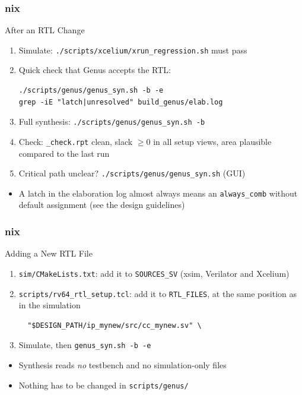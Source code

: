 \documentclass{beamer}
\newcommand{\astitle}{nix}
\newcommand{\assubtitle}{nix}
\newcommand{\cmd}[1]{\texttt{#1}}
\begin{document}
\renewcommand{\assubtitle}{After an RTL Change}
\begin{frame}[fragile]
\frametitle{\astitle}
\begin{block}{\assubtitle}
  \footnotesize
  \begin{enumerate}
    \item Simulate: \cmd{./scripts/xcelium/xrun\_regression.sh} must pass
    \item Quick check that Genus accepts the RTL:
\begin{lstlisting}[style=sh]
./scripts/genus/genus_syn.sh -b -e
grep -iE "latch|unresolved" build_genus/elab.log
\end{lstlisting}
    \item Full synthesis: \cmd{./scripts/genus/genus\_syn.sh -b}
    \item Check: \cmd{\_check.rpt} clean, slack $\ge 0$ in all setup views,
      area plausible compared to the last run
    \item Critical path unclear? \cmd{./scripts/genus/genus\_syn.sh} (GUI)
  \end{enumerate}
  \vspace{4pt}
  \begin{itemize}
    \item A latch in the elaboration log almost always means an \cmd{always\_comb}
      without default assignment (see the design guidelines)
  \end{itemize}
\end{block}
\end{frame}

\renewcommand{\assubtitle}{Adding a New RTL File}
\begin{frame}[fragile]
\frametitle{\astitle}
\begin{block}{\assubtitle}
  \footnotesize
  \begin{enumerate}
    \item \cmd{sim/CMakeLists.txt}: add it to \cmd{SOURCES\_SV}
      (xsim, Verilator and Xcelium)
    \item \cmd{scripts/rv64\_rtl\_setup.tcl}: add it to \cmd{RTL\_FILES},
      at the same position as in the simulation
\begin{lstlisting}
  "$DESIGN_PATH/ip_mynew/src/cc_mynew.sv" \
\end{lstlisting}
    \item Simulate, then \cmd{genus\_syn.sh -b -e}
  \end{enumerate}
  \vspace{4pt}
  \begin{itemize}
    \item Synthesis reads \emph{no} testbench and no simulation-only files
    \item Nothing has to be changed in \cmd{scripts/genus/}
  \end{itemize}
\end{block}
\end{frame}
\end{document}
